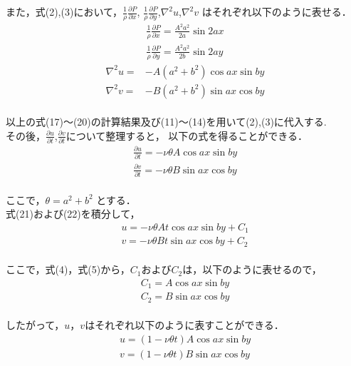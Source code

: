 \documentclass[12pt,a4paper]{jsarticle}
\begin{document}
また，式(2),(3)において，$\frac{1}{\rho}\frac{\partial P}{\partial x}$,
$\frac{1}{\rho}\frac{\partial P}{\partial y}$,$ \nabla^2u$,$\nabla^2v$
はそれぞれ以下のように表せる．
\begin{eqnarray}
    \frac{1}{\rho}
    \frac{\partial P}{\partial x}
    =
    \frac{A^2a^2}{2a}\sin {2ax}
    \\
    \frac{1}{\rho}
    \frac{\partial P}{\partial y}
    =
    \frac{A^2a^2}{2b}\sin {2ay}
\end{eqnarray}
\begin{eqnarray}
    \nabla^2u
    =&
    -A
    \left(
    a^2+b^2
    \right)
    \cos{ax}\sin{by}
    \\
    \nabla^2v
    =&
    -B
    \left(
    a^2+b^2
    \right)
    \sin{ax}\cos{by}
\end{eqnarray}\\
以上の式(17)〜(20)の計算結果及び(11)〜(14)を用いて(2),(3)に代入する.\\
その後，$\frac{\partial u}{\partial t}$,$\frac{\partial v}{\partial t}$について整理すると，
以下の式を得ることができる．
\begin{eqnarray}
    \frac{\partial u}{\partial t}
    =
    -\nu \theta A \cos{ax} \sin{by}
\end{eqnarray}
\begin{eqnarray}
    \frac{\partial v}{\partial t}
    =
    -\nu \theta B \sin{ax} \cos{by}
\end{eqnarray}
\\
ここで，$\theta=a^2+b^2$ とする．\\
式(21)および(22)を積分して，
\begin{eqnarray}
    u=-\nu \theta A t \cos{ax} \sin{by}+C_1
    \\
    v=-\nu \theta B t \sin{ax} \cos{by}+C_2
\end{eqnarray}
\\
ここで，式(4)，式(5)から，$C_1$および$C_2$は，以下のように表せるので，
\begin{eqnarray}
    C_1=A \cos ax \sin by
    \\
    C_2=B \sin ax \cos by
\end{eqnarray}
\\
したがって，$u$，$v$はそれぞれ以下のように表すことができる．
\begin{eqnarray}
    u
    =
    \left(
    1-\nu \theta t
    \right)
    A \cos ax \sin by
    \\
    v
    =
    \left(
    1-\nu \theta t
    \right)
    B \sin ax \cos by
\end{eqnarray}\\
\end{document}
